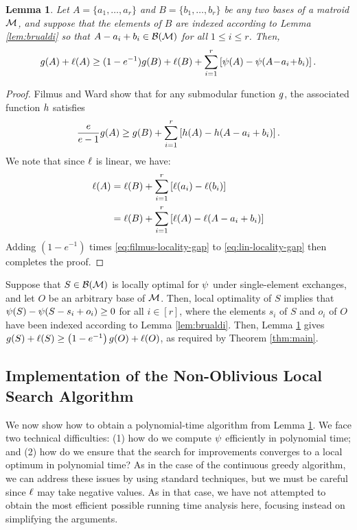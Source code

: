 \documentclass{article}
\newtheorem{lemma}[theorem]{Lemma}
\theoremstyle{definition}
\begin{document}
\begin{lemma}
\label{lem:locality-gap}
Let $A = \{a_{1},\ldots,a_{r}\}$ and $B = \{b_{1},\ldots,b_{r}\}$ be any two bases of a matroid $\mathcal{M}$, and suppose that the elements of $B$ are indexed according to Lemma \ref{lem:brualdi} so that $A - a_{i} + b_{i} \in \mathcal{B}(\mathcal{M})$ for all $1 \le i \le r$.  Then,
\begin{equation*}
g(A) + \ell(A) 
\ge (1 - e^{-1})g(B) + \ell(B) + \sum_{i=1}^{r}\left[\psi(A) - \psi(A\!-\!a_{i}\!+\!b_{i})\right].
\end{equation*}
\end{lemma}
\begin{proof}
Filmus and Ward \cite[Theorem 5.1, p.\ 526]{Filmus2014} show that for any submodular function $g$, the associated function $h$ satisfies
\begin{equation}
\label{eq:filmus-locality-gap}
\frac{e}{e - 1}g(A) \ge g(B) + \sum_{i=1}^{r}\left[h(A) - h(A - a_{i} + b_{i})\right].
\end{equation}
We note that since $\ell$ is linear, we have:
\begin{align}
\label{eq:lin-locality-gap}
\ell(A)
&= \ell(B) + \sum_{i = 1}^{r}\left[\ell(a_{i}) - \ell(b_{i})\right] \notag \\
&= \ell(B) + \sum_{i = 1}^{r}\left[\ell(A) - \ell(A - a_{i} + b_{i})\right] 
\end{align}
Adding $(1 - e^{-1})$ times \eqref{eq:filmus-locality-gap} to \eqref{eq:lin-locality-gap} then completes the proof.
\end{proof}

Suppose that $S \in \mathcal{B}(\mathcal{M})$ is locally optimal for $\psi$ under single-element exchanges, and let $O$ be an arbitrary base of $\mathcal{M}$.  Then, local optimality of $S$ implies that $\psi(S) - \psi(S - s_{i} + o_{i}) \ge 0$ for all $i \in [r]$, where the elements $s_{i}$ of $S$ and $o_{i}$ of $O$ have been indexed according to Lemma \ref{lem:brualdi}.  Then, Lemma \ref{lem:locality-gap} gives $g(S) + \ell(S) \ge \left(1 - e^{-1}\right)g(O) + \ell(O)$, as required by Theorem \ref{thm:main}.

\subsection{Implementation of the Non-Oblivious Local Search Algorithm}
\label{sec:impl-non-obliv}

We now show how to obtain a polynomial-time algorithm from Lemma \ref{lem:locality-gap}.  We face two technical difficulties:
(1) how do we compute $\psi$ efficiently in polynomial time; and (2) how do we ensure that the search for improvements converges to a local optimum in polynomial time?  As in the case of the continuous greedy algorithm, we can address these issues by using standard techniques, but we must be careful since $\ell$ may take negative values.  As in that case, we have not attempted to obtain the most efficient possible running time analysis here, focusing instead on simplifying the arguments.
\end{document}
